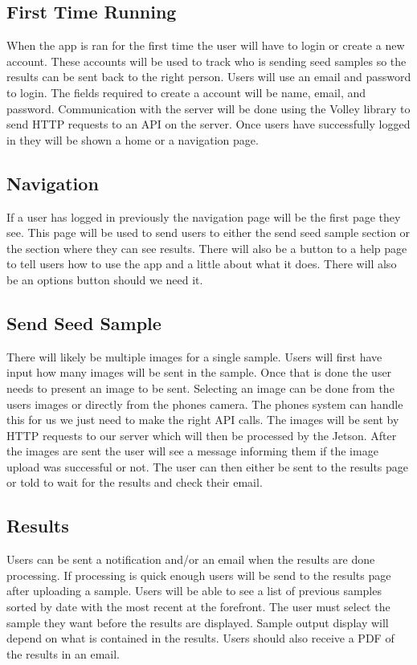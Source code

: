 \documentclass[onecolumn, draftclsnofoot,10pt, compsoc]{IEEEtran}
\begin{document}
	\subsection{First Time Running}
		When the app is ran for the first time the user will have to login or create a new account.
		These accounts will be used to track who is sending seed samples so the results can be sent back to the right person.
		Users will use an email and password to login.
		The fields required to create a account will be name, email, and password.
		Communication with the server will be done using the Volley library to send HTTP requests to an API on the server.
		Once users have successfully logged in they will be shown a home or a navigation page.

	\subsection{Navigation}
		If a user has logged in previously the navigation page will be the first page they see.
		This page will be used to send users to either the send seed sample section or the section where they can see results.
		There will also be a button to a help page to tell users how to use the app and a little about what it does.
		There will also be an options button should we need it.

	\subsection{Send Seed Sample}
		There will likely be multiple images for a single sample.
		Users will first have input how many images will be sent in the sample.
		Once that is done the user needs to present an image to be sent.
		Selecting an image can be done from the users images or directly from the phones camera.
		The phones system can handle this for us we just need to make the right API calls.
		The images will be sent by HTTP requests to our server which will then be processed by the Jetson.
		After the images are sent the user will see a message informing them if the image upload was successful or not.
		The user can then either be sent to the results page or told to wait for the results and check their email.

	\subsection{Results}
		Users can be sent a notification and/or an email when the results are done processing.
		If processing is quick enough users will be send to the results page after uploading a sample.
		Users will be able to see a list of previous samples sorted by date with the most recent at the forefront.
		The user must select the sample they want before the results are displayed.
		Sample output display will depend on what is contained in the results.
		Users should also receive a PDF of the results in an email.
		



\end{document}
